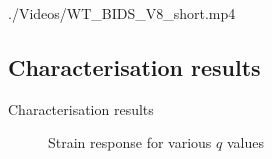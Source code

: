 \documentclass[aspectratio=169]{beamer}            %
\begin{document}
\begin{frame}[plain]

  \centering
    {./Videos/WT_BIDS_V8_short.mp4}
	
\end{frame}

\subsection[Characterisation results]{Characterisation results}
\begin{frame}{Characterisation results}

  \begin{figure}[!htb]
    \centering
		
		\caption{Strain response for various ${q}$ values}
		\label{fig:StrainResponse2q}
  \end{figure}

\end{frame}

\end{document}
